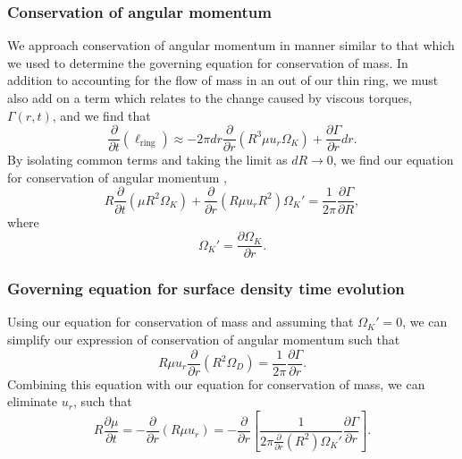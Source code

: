 \documentclass[aps,pra,twocolumn]{revtex4-1}
\begin{document}
\subsubsection{\label{section 2.1.2} Conservation of angular momentum}
We approach conservation of angular momentum in manner similar to that which we used to determine the governing equation for conservation of mass. In addition to accounting for the flow of mass in an out of our thin ring, we must also add on a term which relates to the change caused by viscous torques, $\Gamma(r, t)$, and we find that
\begin{equation}
\frac{\partial}{\partial t}\left( \ell_{\text{ring}} \right) \approx  -2\pi dr \frac{\partial}{\partial r}(R^3 \mu u_r \Omega_K) + \frac{\partial \Gamma}{\partial r}dr.
\nonumber
\end{equation}
By isolating common terms and taking the limit as $dR \rightarrow 0$, we find our equation for conservation of angular momentum \cite{king2002},
\begin{equation}
R \frac{\partial}{\partial t} (\mu R^2 \Omega_K) + \frac{\partial}{\partial r} (R \mu u_r R^2  )\Omega_K' = \frac{1}{2\pi} \frac{\partial \Gamma}{\partial R}, \label{consAng}
\end{equation}
where
\begin{equation}
\Omega_K' = \frac{\partial \Omega_K}{\partial r}.
\end{equation}

\subsubsection{\label{section 2.1.3} Governing equation for surface density time evolution}
Using our equation for conservation of mass and assuming that $\Omega_K' = 0$, we can simplify our expression of conservation of angular momentum such that
\begin{equation}
R\mu u_r \frac{\partial}{\partial r} (R^2 \Omega_D) = \frac{1}{2\pi} \frac{\partial \Gamma}{\partial r}.
\end{equation}
Combining this equation with our equation for conservation of mass, we can eliminate $u_r$, such that
\begin{equation}
R \frac{\partial \mu}{\partial t} = -\frac{\partial}{\partial r}(R \mu u_r) = - \frac{\partial}{\partial r}\left[ \frac{1}{2\pi \frac{\partial}{\partial r}(R^2)\Omega_K'}\frac{\partial \Gamma}{\partial r} \right].
\end{equation}
\end{document}
